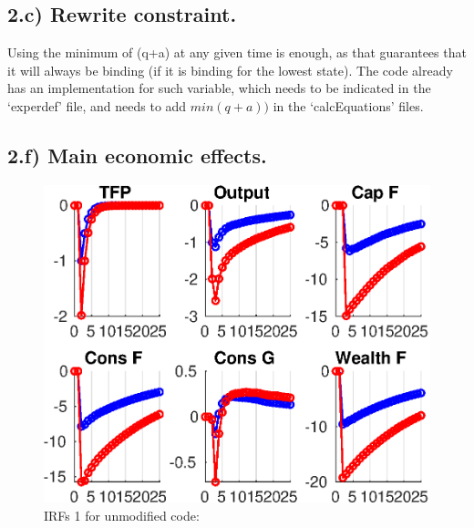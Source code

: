 \documentclass{article}
\begin{document}
\subsection*{2.c) Rewrite constraint.}

Using the minimum of (q+a) at any given time is enough, as that guarantees that it will always be binding (if it is binding for the lowest state). The code already has an implementation for such variable, which needs to be indicated in the `experdef' file, and needs to add $min(q+a))$ in the `calcEquations' files.






\subsection*{2.f) Main economic effects.}



\begin{figure}
\caption{IRFs 1 for unmodified code:}
\includegraphics [width=5in]{PS03_projection_code_modif/Results/GR_orig_diff_IRF1.eps}
\end{figure}
\end{document}
